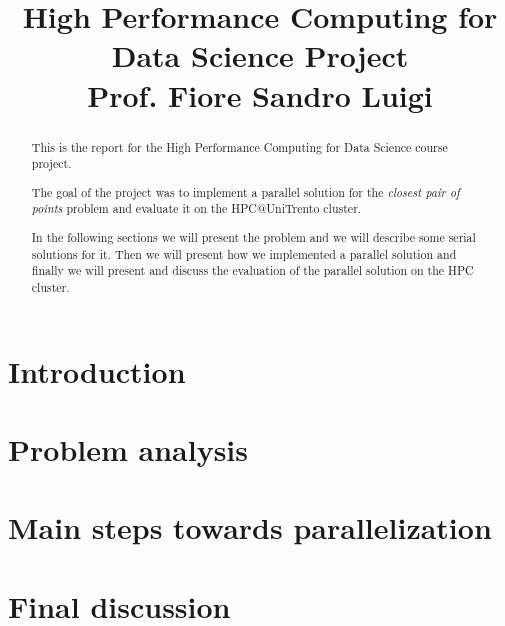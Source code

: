 \documentclass[conference]{IEEEtran}
\begin{document}
\title{High Performance Computing for Data Science Project\\
{\footnotesize Prof. Fiore Sandro Luigi}}

\author{
    \and
}

\maketitle

\begin{abstract}
    This is the report for the High Performance Computing for Data Science course project.
    
    The goal of the project was to implement a parallel solution for the \textit{closest pair of points} problem
    and evaluate it on the HPC@UniTrento cluster.
    
    In the following sections we will present the problem and we will describe some serial solutions
    for it. Then we will present how we implemented a parallel solution and finally we will present and
    discuss the evaluation of the parallel solution on the HPC cluster.
\end{abstract}

\section{Introduction}

\section{Problem analysis}

\section{Main steps towards parallelization}

\section{Final discussion}




\end{document}
